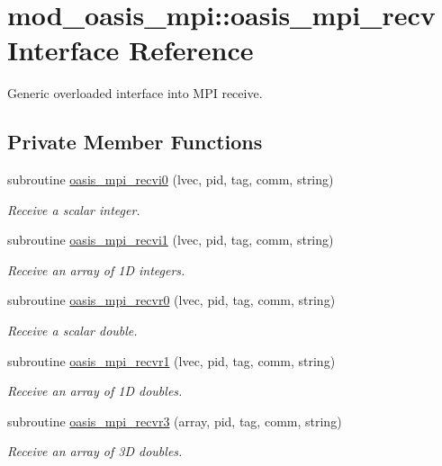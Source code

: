 \hypertarget{interfacemod__oasis__mpi_1_1oasis__mpi__recv}{\section{mod\+\_\+oasis\+\_\+mpi\+:\+:oasis\+\_\+mpi\+\_\+recv Interface Reference}
\label{interfacemod__oasis__mpi_1_1oasis__mpi__recv}
}


Generic overloaded interface into M\+P\+I receive.  


\subsection*{Private Member Functions}
\begin{DoxyCompactItemize}
\item 
subroutine \hyperlink{interfacemod__oasis__mpi_1_1oasis__mpi__recv_a074c7ea11bb2513a57792afe292a9305}{oasis\+\_\+mpi\+\_\+recvi0} (lvec, pid, tag, comm, string)
\begin{DoxyCompactList}\small\item\em Receive a scalar integer. \end{DoxyCompactList}\item 
subroutine \hyperlink{interfacemod__oasis__mpi_1_1oasis__mpi__recv_a7d8a63dcb97e7d155108fa6a26b1bfa4}{oasis\+\_\+mpi\+\_\+recvi1} (lvec, pid, tag, comm, string)
\begin{DoxyCompactList}\small\item\em Receive an array of 1\+D integers. \end{DoxyCompactList}\item 
subroutine \hyperlink{interfacemod__oasis__mpi_1_1oasis__mpi__recv_a6c501c168ddca69b50972959025044ff}{oasis\+\_\+mpi\+\_\+recvr0} (lvec, pid, tag, comm, string)
\begin{DoxyCompactList}\small\item\em Receive a scalar double. \end{DoxyCompactList}\item 
subroutine \hyperlink{interfacemod__oasis__mpi_1_1oasis__mpi__recv_a6706db7315d932b5ff3a1fff5c917ea8}{oasis\+\_\+mpi\+\_\+recvr1} (lvec, pid, tag, comm, string)
\begin{DoxyCompactList}\small\item\em Receive an array of 1\+D doubles. \end{DoxyCompactList}\item 
subroutine \hyperlink{interfacemod__oasis__mpi_1_1oasis__mpi__recv_a8a3e3cd1cd642121fb4cd943a744af68}{oasis\+\_\+mpi\+\_\+recvr3} (array, pid, tag, comm, string)
\begin{DoxyCompactList}\small\item\em Receive an array of 3\+D doubles. \end{DoxyCompactList}\end{DoxyCompactItemize}


